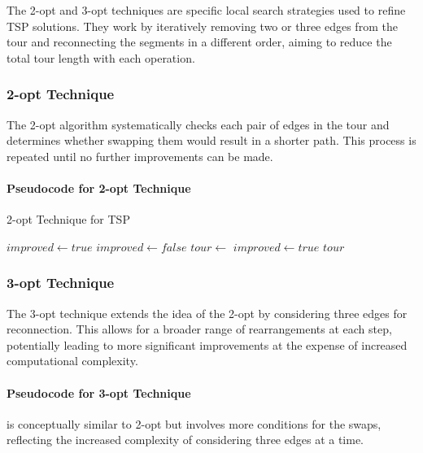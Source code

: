 The 2-opt and 3-opt techniques are specific local search strategies used to refine TSP solutions. They work by iteratively removing two or three edges from the tour and reconnecting the segments in a different order, aiming to reduce the total tour length with each operation.

\subsubsection{2-opt Technique}

The 2-opt algorithm systematically checks each pair of edges in the tour and determines whether swapping them would result in a shorter path. This process is repeated until no further improvements can be made.

\paragraph{Pseudocode for 2-opt Technique}

\begin{algorithm}
	\caption{2-opt Technique for TSP}\label{alg:twoopt}
	\begin{algorithmic}[1]
		\State $improved \gets true$
		\State $improved \gets false$
		\State $tour \gets$ 
		\State $improved \gets true$
		\EndIf
		\EndFor
		\EndFor
		\EndWhile
		\State \Return $tour$
		\EndProcedure
	\end{algorithmic}
\end{algorithm}

\subsubsection{3-opt Technique}

The 3-opt technique extends the idea of the 2-opt by considering three edges for reconnection. This allows for a broader range of rearrangements at each step, potentially leading to more significant improvements at the expense of increased computational complexity.

\paragraph{Pseudocode for 3-opt Technique} is conceptually similar to 2-opt but involves more conditions for the swaps, reflecting the increased complexity of considering three edges at a time.

